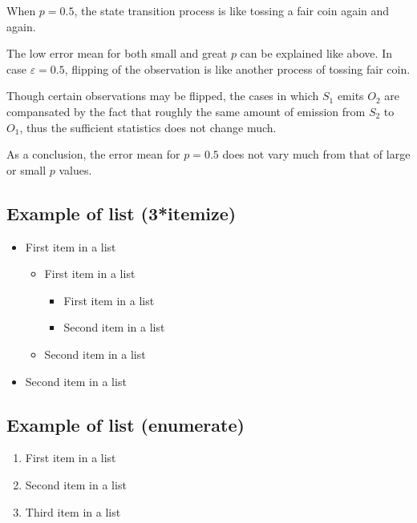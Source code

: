 \documentclass[paper=a4, fontsize=11pt]{scrartcl} %
\numberwithin{equation}{section} %
\numberwithin{figure}{section} %
\numberwithin{table}{section} %
\begin{document}
When $p=0.5$, the state transition process is like tossing a fair coin again and again.

The low error mean for both small and great $p$ can be explained like above. In case $\varepsilon=0.5$, flipping of the observation is like another process of tossing fair coin.

Though certain observations may be flipped, the cases in which $S_1$ emits $O_2$ are compansated by the fact that roughly the same amount of emission from $S_2$ to $O_1$, thus the sufficient statistics does not change much.

As a conclusion, the error mean for $p=0.5$ does not vary much from that of large or small $p$ values.


\subsection{Example of list (3*itemize)}
\begin{itemize}
	\item First item in a list 
		\begin{itemize}
		\item First item in a list 
			\begin{itemize}
			\item First item in a list 
			\item Second item in a list 
			\end{itemize}
		\item Second item in a list 
		\end{itemize}
	\item Second item in a list 
\end{itemize}


\subsection{Example of list (enumerate)}
\begin{enumerate}
\item First item in a list 
\item Second item in a list 
\item Third item in a list
\end{enumerate}

\end{document}

